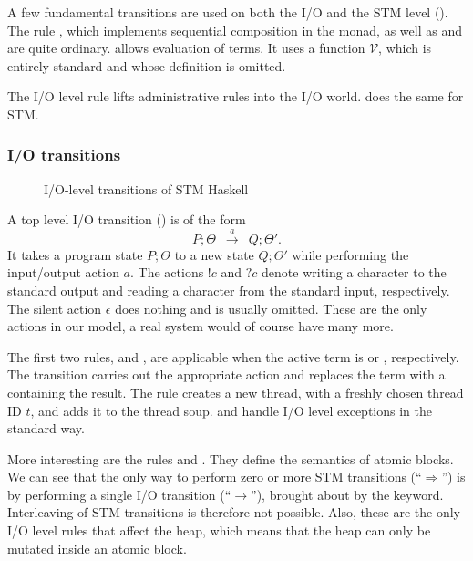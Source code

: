 A few fundamental transitions are used on both the I/O and the STM level ().
The rule , which implements sequential composition in the monad, as well as  and  are quite ordinary.
 allows evaluation of terms.
It uses a function $\mathcal{V}$, which is entirely standard and whose definition is omitted.

The I/O level rule  lifts administrative rules into the I/O world.  does the same for STM.

\subsubsection{I/O transitions}

\begin{figure}

\caption{I/O-level transitions of STM Haskell\\ \parencite{harris-et-al-2005}}
\label{fig:orig-io}
\end{figure}

A top level I/O transition () is of the form
$$P;\Theta \enspace\xrightarrow{a}\enspace Q;\Theta'.$$ 
It takes a program state $P;\Theta$ to a new state $Q;\Theta'$ while performing the input/output action $a$.
The actions $!c$ and $?c$ denote writing a character to the standard output and reading a character from the standard input, respectively.
The silent action $\epsilon$ does nothing and is usually omitted.
These are the only actions in our model, a real system would of course have many more.

The first two rules,  and , are applicable when the active term is  or , respectively.
The transition carries out the appropriate action and replaces the term with a  containing the result.
The rule  creates a new thread, with a freshly chosen thread ID $t$, and adds it to the thread soup.
 and  handle I/O level exceptions in the standard way.

More interesting are the rules  and .
They define the semantics of atomic blocks.
We can see that the only way to perform zero or more STM transitions (``$\Rightarrow$'') is by performing a single I/O transition (``$\rightarrow$''), brought about by the  keyword.
Interleaving of STM transitions is therefore not possible.
Also, these are the only I/O level rules that affect the heap, which means that the heap can only be mutated inside an atomic block.

